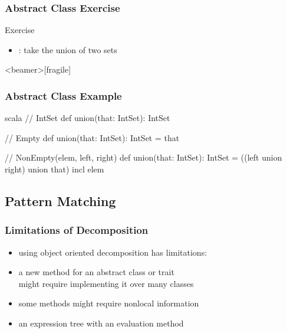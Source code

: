 \documentclass[dvipsnames]{beamer}
\theoremstyle{plain}
\begin{document}
\begin{frame}
  \frametitle{Abstract Class Exercise}

  \begin{block}{Exercise}
    \begin{itemize}
      \item {}: take the union of two sets
    \end{itemize}
  \end{block}
\end{frame}

\begin{frame}<beamer>[fragile]
  \frametitle{Abstract Class Example}

  \begin{example}[Scala]
    \begin{pygments}{scala}
// IntSet
def union(that: IntSet): IntSet

// Empty
def union(that: IntSet): IntSet = that

// NonEmpty(elem, left, right)
def union(that: IntSet): IntSet =
    ((left union right) union that) incl elem
    \end{pygments}
  \end{example}
\end{frame}

\subsection{Pattern Matching}

\begin{frame}
  \frametitle{Limitations of Decomposition}

  \begin{itemize}
    \item using object oriented decomposition has limitations:
    \item a new method for an abstract class or trait\\
      might require implementing it over many classes
    \item some methods might require nonlocal information
  \end{itemize}

  \pause
  \begin{example}[Scala]
    \begin{itemize}
      \item an expression tree with an evaluation method
    \end{itemize}
  \end{example}
\end{frame}
\end{document}
